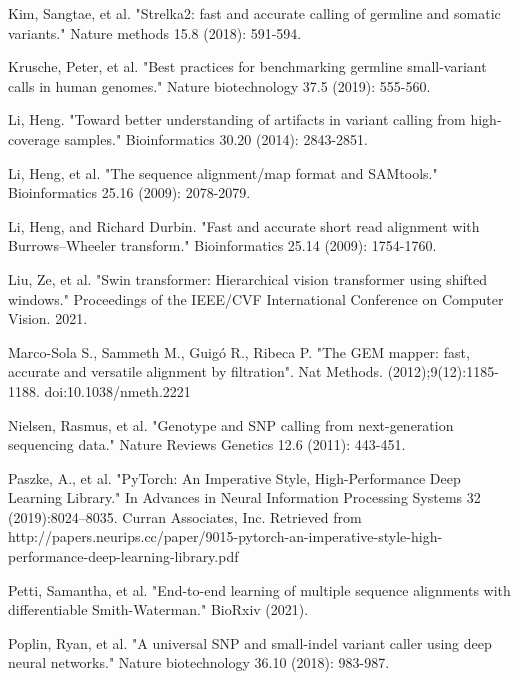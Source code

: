 \documentclass[]{article}
\begin{document}
\vspace{8pt}
Kim, Sangtae, et al. "Strelka2: fast and accurate calling of germline and somatic variants." Nature methods 15.8 (2018): 591-594.

\vspace{8pt}
Krusche, Peter, et al. "Best practices for benchmarking germline small-variant calls in human genomes." Nature biotechnology 37.5 (2019): 555-560.

\vspace{8pt}
Li, Heng. "Toward better understanding of artifacts in variant calling from high-coverage samples." Bioinformatics 30.20 (2014): 2843-2851.

\vspace{8pt}
Li, Heng, et al. "The sequence alignment/map format and SAMtools." Bioinformatics 25.16 (2009): 
2078-2079.


\vspace{8pt}
Li, Heng, and Richard Durbin. "Fast and accurate short read alignment with Burrows–Wheeler transform." Bioinformatics 25.14 (2009): 1754-1760.

\vspace{8pt}
Liu, Ze, et al. "Swin transformer: Hierarchical vision transformer using shifted windows." Proceedings of the IEEE/CVF International Conference on Computer Vision. 2021.

\vspace{8pt}
Marco-Sola S., Sammeth M., Guigó R., Ribeca P. "The GEM mapper: fast, accurate and versatile alignment by filtration". Nat Methods. (2012);9(12):1185-1188. doi:10.1038/nmeth.2221

\vspace{8pt}
Nielsen, Rasmus, et al. "Genotype and SNP calling from next-generation sequencing data." Nature Reviews Genetics 12.6 (2011): 443-451.

\vspace{8pt}
Paszke, A., et al. "PyTorch: An Imperative Style, High-Performance Deep Learning Library." In Advances in Neural Information Processing Systems 32 (2019):8024–8035. Curran Associates, Inc. Retrieved from http://papers.neurips.cc/paper/9015-pytorch-an-imperative-style-high-performance-deep-learning-library.pdf

\vspace{8pt}
Petti, Samantha, et al. "End-to-end learning of multiple sequence alignments with differentiable Smith-Waterman." BioRxiv (2021).

\vspace{8pt}
Poplin, Ryan, et al. "A universal SNP and small-indel variant caller using deep neural networks." Nature biotechnology 36.10 (2018): 983-987.
\end{document}
